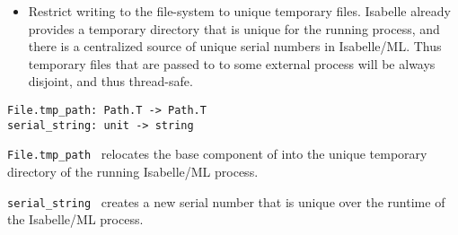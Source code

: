 \begin{isabellebody}
\begin{isamarkuptext}
\begin{itemize}
  \item Restrict writing to the file-system to unique temporary files.
  Isabelle already provides a temporary directory that is unique for
  the running process, and there is a centralized source of unique
  serial numbers in Isabelle/ML.  Thus temporary files that are passed
  to to some external process will be always disjoint, and thus
  thread-safe.

  \end{itemize}%
\end{isamarkuptext}%
\isamarkuptrue%
%
\isadelimmlref
%
\endisadelimmlref
%
\isatagmlref
%
\begin{isamarkuptext}%
\begin{mldecls}
  \verb|File.tmp_path: Path.T -> Path.T| \\
  \verb|serial_string: unit -> string| \\
  \end{mldecls}

  \begin{description}

  \item \verb|File.tmp_path|~ relocates the base
  component of  into the unique temporary directory of
  the running Isabelle/ML process.

  \item \verb|serial_string|~ creates a new serial number
  that is unique over the runtime of the Isabelle/ML process.


\end{description}
\end{isamarkuptext}
\end{isabellebody}

